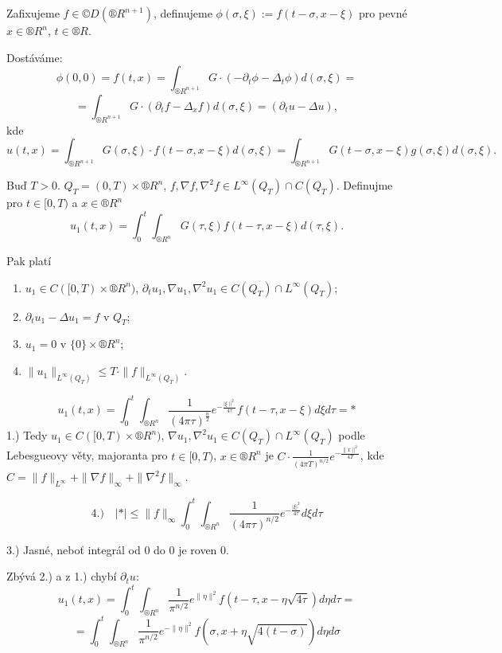 \documentclass[12pt]{article}					%
\begin{document}
\begin{dusledek}
	Zafixujeme $f \in ©D(®R^{n+1})$, definujeme $\phi(\sigma, \xi) := f(t - \sigma, x - \xi)$ pro pevné $x \in ®R^n$, $t \in ®R$.

	Dostáváme:
	$$ \phi(0, 0) = f(t, x) = \int_{®R^{n+1}} G·(-\partial_t \phi - \Delta_t \phi) d(\sigma, \xi) = $$
	$$ = \int_{®R^{n+1}} G·(\partial_t f - \Delta_x f) d(\sigma, \xi) = (\partial_t u - \Delta u), $$
	kde
	$$ u(t, x) = \int_{®R^{n+1}} G(\sigma, \xi)·f(t - \sigma, x - \xi) d(\sigma, \xi) = \int_{®R^{n+1}} G(t - \sigma, x - \xi)g(\sigma, \xi)d(\sigma, \xi). $$
\end{dusledek}


\begin{veta}
	Buď $T > 0$. $Q_T = (0, T) \times ®R^n$, $f, \nabla f, \nabla^2 f \in L^∞(Q_T) \cap C(Q_T)$. Definujme pro $t \in [0, T)$ a $x \in ®R^n$
	$$ u_1(t, x) = \int_0^t \int_{®R^n} G(\tau, \xi) f(t - \tau, x - \xi) d(\tau, \xi). $$

	Pak platí
	\begin{enumerate}
		\item $u_1 \in C([0, T) \times ®R^n)$, $\partial_t u_1, \nabla u_1, \nabla^2 u_1 \in C(Q_T) \cap L^∞(Q_T)$;
		\item $\partial_t u_1 - \Delta u_1 = f$ v $Q_T$;
		\item $u_1 = 0$ v $\{0\} \times ®R^n$;
		\item $\|u_1\|_{L^∞(Q_T)} ≤ T·\|f\|_{L^∞(Q_T)}$.
	\end{enumerate}

	\begin{dukazin}
		$$ u_1(t, x) = \int_0^t \int_{®R^n} \frac{1}{(4\pi\tau)^{\frac{n}{2}}} e^{-\frac{|\xi\|^2}{4\tau}} f(t - \tau, x - \xi) d\xi d\tau = * $$
		1.) Tedy $u_1 \in C([0, T)\times ®R^n)$, $\nabla u_1, \nabla^2 u_1 \in C(Q_T) \cap L^∞(Q_T)$ podle Lebesgueovy věty, majoranta pro $t \in [0, T)$, $x \in ®R^n$ je $C·\frac{1}{(4\pi T)^{n / 2}} e^{-\frac{\|x\|^2}{4T}}$, kde $C = \|f\|_{L^∞} + \|\nabla f\|_∞ + \|\nabla^2 f\|_∞$.

		$$ 4.) \quad |*| ≤ \|f\|_∞ \int_0^t \int_{®R^n} \frac{1}{(4\pi\tau)^{n / 2}}e^{-\frac{|\xi|^2}{4\tau}} d\xi d\tau $$

		3.) Jasné, neboť integrál od 0 do 0 je roven 0.
	\end{dukazin}

	\begin{dukazin}
		Zbývá 2.) a z 1.) chybí $\partial_t u$:
		$$ u_1(t, x) = \int_0^t \int_{®R^n} \frac{1}{\pi^{n / 2}} e^{\|\eta\|^2} f(t - \tau, x - \eta\sqrt{4\tau}) d\eta d\tau = $$
		$$ = \int_0^t \int_{®R^n} \frac{1}{\pi^{n / 2}} e^{-\|\eta\|^2}f(\sigma, x + \eta \sqrt{4(t - \sigma)}) d\eta d\sigma $$


\end{dukazin}
\end{veta}
\end{document}
